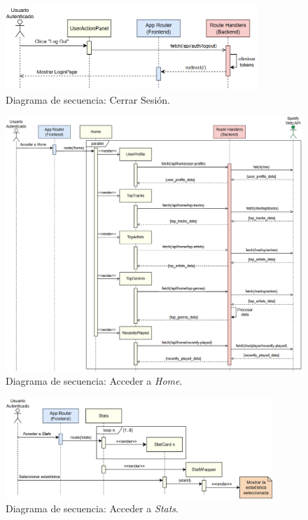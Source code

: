 \begin{figure}[H]
    \centering
    \includegraphics[width=0.85\textwidth]{figures/diagramas_secuencia/ds_cerrar_sesion.png}
    \caption{Diagrama de secuencia: Cerrar Sesión.}
    \label{fig:ds_cerrar_sesion}
\end{figure}

\begin{figure}[H]
    \centering
    \includegraphics[width=\textwidth]{figures/diagramas_secuencia/ds_acceder_home.png}
    \caption{Diagrama de secuencia: Acceder a \textit{Home}.}
    \label{fig:ds_acceder_home}
\end{figure}

\begin{figure}[H]
    \centering
    \includegraphics[width=0.9\textwidth]{figures/diagramas_secuencia/ds_acceder_stats.png}
    \caption{Diagrama de secuencia: Acceder a \textit{Stats}.}
    \label{fig:ds_acceder_stats}
\end{figure}

